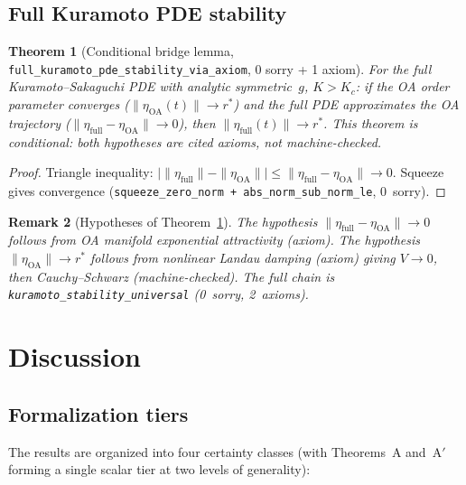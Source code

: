 \documentclass[11pt,a4paper]{article}
\newtheorem{theorem}{Theorem}[section]
\newtheorem{remark}[theorem]{Remark}
\theoremstyle{definition}
\begin{document}
\subsection{Full Kuramoto PDE stability}

\begin{theorem}[Conditional bridge lemma, \texttt{full\_kuramoto\_pde\_stability\_via\_axiom}, 0 sorry + 1 axiom]\label{thm:full}
For the full Kuramoto--Sakaguchi PDE with analytic symmetric~$g$, $K > K_c$: if the OA order parameter converges ($\|\eta_{\mathrm{OA}}(t)\| \to r^*$) and the full PDE approximates the OA trajectory ($\|\eta_{\mathrm{full}} - \eta_{\mathrm{OA}}\| \to 0$), then $\|\eta_{\mathrm{full}}(t)\| \to r^*$. This theorem is conditional: both hypotheses are cited axioms, not machine-checked.
\end{theorem}
\begin{proof}
Triangle inequality: $\bigl|\|\eta_{\mathrm{full}}\| - \|\eta_{\mathrm{OA}}\|\bigr| \leq \|\eta_{\mathrm{full}} - \eta_{\mathrm{OA}}\| \to 0$. Squeeze gives convergence (\texttt{squeeze\_zero\_norm + abs\_norm\_sub\_norm\_le}, 0~sorry).
\end{proof}

\begin{remark}[Hypotheses of Theorem~\ref{thm:full}]
The hypothesis $\|\eta_{\mathrm{full}} - \eta_{\mathrm{OA}}\| \to 0$ follows from OA manifold exponential attractivity \cite{dietert-fernandez2018} (axiom). The hypothesis $\|\eta_{\mathrm{OA}}\| \to r^*$ follows from nonlinear Landau damping \cite{dietert2017} (axiom) giving $V \to 0$, then Cauchy--Schwarz (machine-checked). The full chain is \texttt{kuramoto\_stability\_universal} (0~sorry, 2~axioms).
\end{remark}

\section{Discussion}\label{sec:discussion}

\subsection{Formalization tiers}

The results are organized into four certainty classes (with Theorems~A and~A$'$ forming a single scalar tier at two levels of generality):
\end{document}
